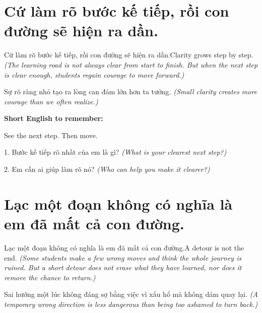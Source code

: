 \section{Cứ làm rõ bước kế tiếp, rồi con đường sẽ hiện ra dần.}
\begin{truyen}{Cứ làm rõ bước kế tiếp, rồi con đường sẽ hiện ra dần.}{Clarity grows step by step.}
\textit{(The learning road is not always clear from start to finish. But when the next step is clear enough, students regain courage to move forward.)}
\end{truyen}

\begin{baihoc}
Sự rõ ràng nhỏ tạo ra lòng can đảm lớn hơn ta tưởng.
\textit{(Small clarity creates more courage than we often realize.)}
\end{baihoc}

\begin{ghinhoanh}
\textbf{Short English to remember:}

See the next step. Then move.

\end{ghinhoanh}

\begin{tuhocnhanh}
1. Bước kế tiếp rõ nhất của em là gì? \textit{(What is your clearest next step?)}

2. Em cần ai giúp làm rõ nó? \textit{(Who can help you make it clearer?)}
\end{tuhocnhanh}
\ngancach


\section{Lạc một đoạn không có nghĩa là em đã mất cả con đường.}
\begin{truyen}{Lạc một đoạn không có nghĩa là em đã mất cả con đường.}{A detour is not the end.}
\textit{(Some students make a few wrong moves and think the whole journey is ruined. But a short detour does not erase what they have learned, nor does it remove the chance to return.)}
\end{truyen}

\begin{baihoc}
Sai hướng một lúc không đáng sợ bằng việc vì xấu hổ mà không dám quay lại.
\textit{(A temporary wrong direction is less dangerous than being too ashamed to turn back.)}
\end{baihoc}

